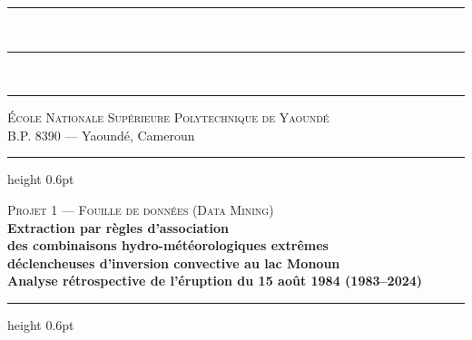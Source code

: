 \documentclass[12pt, a4paper]{article}
\begin{document}
\color{TexteP}

\begin{titlepage}
\pagecolor{GrisP}
\noindent
\textcolor{VertSav}{\rule{\linewidth}{4pt}}\\[-1pt]
\textcolor{RougeL}{\rule{\linewidth}{4pt}}\\[-1pt]
\textcolor{OrCam}{\rule{\linewidth}{4pt}}

\vspace{1.6cm}
\begin{center}
\begin{tcolorbox}[enhanced,arc=0pt,colback=NuitBleue,colframe=NuitBleue,
  width=3.2cm,halign=center,left=0pt,right=0pt,top=8pt,bottom=8pt]
\end{tcolorbox}
\end{center}

\vspace{0.3cm}
\begin{center}
  {\large\scshape\color{NuitBleue} École Nationale Supérieure Polytechnique de Yaoundé}\\[0.2em]
  {\small\color{GrisB!80!black} B.P. 8390 — Yaoundé, Cameroun}
\end{center}

\vspace{0.9cm}
{\color{OrCam}\hrule height 0.6pt}
\vspace{0.5cm}

\begin{center}
  {\color{NuitBleue!60!black}\small\scshape Projet 1 — Fouille de données (Data Mining)}\\[0.7em]
  {\color{NuitBleue}\fontsize{17}{22}\selectfont\bfseries
    Extraction par règles d'association\\[0.2em]
    des combinaisons hydro-météorologiques extrêmes\\[0.2em]
    déclencheuses d'inversion convective au lac Monoun\\[0.5em]
    \large Analyse rétrospective de l'éruption du 15 août 1984 (1983--2024)}
\end{center}

\vspace{0.5cm}
{\color{OrCam}\hrule height 0.6pt}
\vspace{1.0cm}


\end{titlepage}
\end{document}
